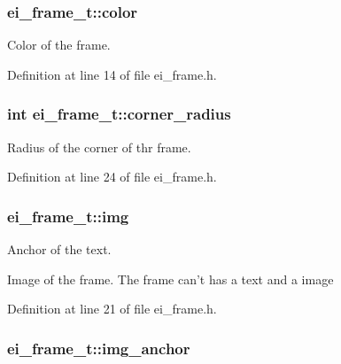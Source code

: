 \hypertarget{structei__frame__t_a421c7e34ec7903666726f2238d3225ea}{
\subsubsection[{color}]{ ei\+\_\+frame\+\_\+t\+::color}}\label{structei__frame__t_a421c7e34ec7903666726f2238d3225ea}


Color of the frame. 



Definition at line 14 of file ei\+\_\+frame.\+h.

\hypertarget{structei__frame__t_aa8e559bc95c985c05d82e0e5f9cd6768}{
\subsubsection[{corner\+\_\+radius}]{\setlength{\rightskip}{0pt plus 5cm}int ei\+\_\+frame\+\_\+t\+::corner\+\_\+radius}}\label{structei__frame__t_aa8e559bc95c985c05d82e0e5f9cd6768}


Radius of the corner of thr frame. 



Definition at line 24 of file ei\+\_\+frame.\+h.

\hypertarget{structei__frame__t_ae973c0cde8752c6d02f507930ab67654}{
\subsubsection[{img}]{ ei\+\_\+frame\+\_\+t\+::img}}\label{structei__frame__t_ae973c0cde8752c6d02f507930ab67654}


Anchor of the text. 

Image of the frame. The frame can't has a text and a image 

Definition at line 21 of file ei\+\_\+frame.\+h.

\hypertarget{structei__frame__t_a76fefc2cd628d20d2de79f96c12996a5}{
\subsubsection[{img\+\_\+anchor}]{ ei\+\_\+frame\+\_\+t\+::img\+\_\+anchor}}\label{structei__frame__t_a76fefc2cd628d20d2de79f96c12996a5}


